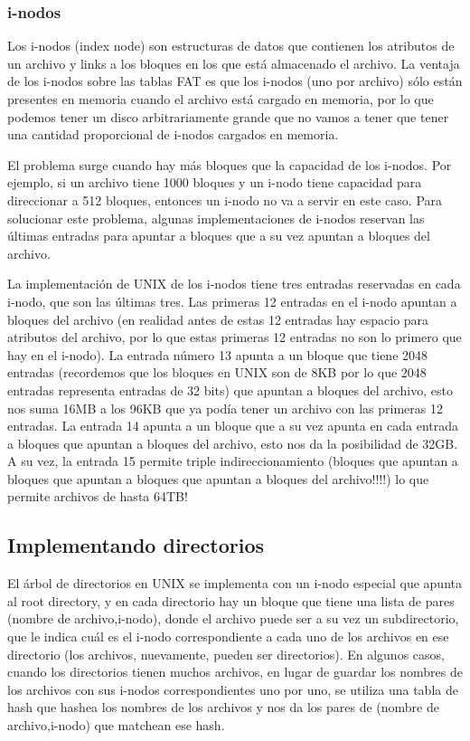\documentclass{article}
\begin{document}
\subsubsection{i-nodos}

Los i-nodos (index node) son estructuras de datos que contienen los atributos de un archivo y links a los bloques en los que est\'a almacenado el archivo. La ventaja de los i-nodos sobre las tablas FAT es que los i-nodos (uno por archivo) s\'olo est\'an presentes en memoria cuando el archivo est\'a cargado en memoria, por lo que podemos tener un disco arbitrariamente grande que no vamos a tener que tener una cantidad proporcional de i-nodos cargados en memoria.

El problema surge cuando hay m\'as bloques que la capacidad de los i-nodos. Por ejemplo, si un archivo tiene 1000 bloques y un i-nodo tiene capacidad para direccionar a 512 bloques, entonces un i-nodo no va a servir en este caso. Para solucionar este problema, algunas implementaciones de i-nodos reservan las \'ultimas entradas para apuntar a bloques que a su vez apuntan a bloques del archivo.

La implementaci\'on de UNIX de los i-nodos tiene tres entradas reservadas en cada i-nodo, que son las \'ultimas tres. Las primeras 12 entradas en el i-nodo apuntan a bloques del archivo (en realidad antes de estas 12 entradas hay espacio para atributos del archivo, por lo que estas primeras 12 entradas no son lo primero que hay en el i-nodo). La entrada n\'umero 13 apunta a un bloque que tiene 2048 entradas (recordemos que los bloques en UNIX son de 8KB por lo que 2048 entradas representa entradas de 32 bits) que apuntan a bloques del archivo, esto nos suma 16MB a los 96KB que ya pod\'ia tener un archivo con las primeras 12 entradas. La entrada 14 apunta a un bloque que a su vez apunta en cada entrada a bloques que apuntan a bloques del archivo, esto nos da la posibilidad de 32GB. A su vez, la entrada 15 permite triple indireccionamiento (bloques que apuntan a bloques que apuntan a bloques que apuntan a bloques del archivo!!!!) lo que permite archivos de hasta 64TB!

\subsection{Implementando directorios}

El \'arbol de directorios en UNIX se implementa con un i-nodo especial que apunta al root directory, y en cada directorio hay un bloque que tiene una lista de pares (nombre de archivo,i-nodo), donde el archivo puede ser a su vez un subdirectorio, que le indica cu\'al es el i-nodo correspondiente a cada uno de los archivos en ese directorio (los archivos, nuevamente, pueden ser directorios). En algunos casos, cuando los directorios tienen muchos archivos, en lugar de guardar los nombres de los archivos con sus i-nodos correspondientes uno por uno, se utiliza una tabla de hash que hashea los nombres de los archivos y nos da los pares de (nombre de archivo,i-nodo) que matchean ese hash.
\end{document}
